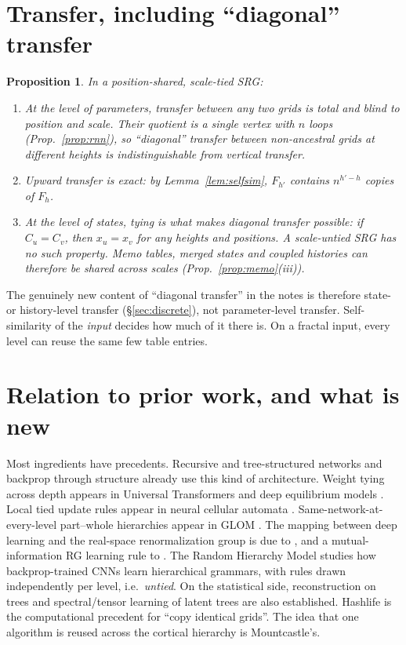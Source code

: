 \documentclass[11pt]{article}
\newtheorem{proposition}[theorem]{Proposition}
\theoremstyle{definition}
\begin{document}
\section{Transfer, including ``diagonal'' transfer}\label{sec:transfer}
\begin{proposition}\label{prop:transfer}
In a position-shared, scale-tied SRG:
\begin{enumerate}
\item At the level of parameters, transfer between any two grids is total and blind to position
and scale. Their quotient is a single vertex with $n$ loops (Prop.~\ref{prop:rnn}), so
``diagonal'' transfer between non-ancestral grids at different heights is indistinguishable
from vertical transfer.
\item Upward transfer is exact: by Lemma~\ref{lem:selfsim}, $F_{h'}$ contains $n^{h'-h}$
copies of $F_h$.
\item At the level of \emph{states}, tying is what makes diagonal transfer possible: if
$C_u=C_v$, then $x_u=x_v$ for \emph{any} heights and positions. A scale-untied SRG has no such
property. Memo tables, merged states and coupled histories can therefore be shared across
scales (Prop.~\ref{prop:memo}(iii)).
\end{enumerate}
\end{proposition}
\noindent The genuinely new content of ``diagonal transfer'' in the notes is therefore
state- or history-level transfer (\S\ref{sec:discrete}), not parameter-level transfer.
Self-similarity of the \emph{input} decides how much of it there is. On a fractal input, every
level can reuse the same few table entries.

\section{Relation to prior work, and what is new}\label{sec:related}
Most ingredients have precedents. Recursive and tree-structured networks and backprop through
structure \cite{goller1996,socher2011} already use this kind of architecture. Weight tying
across depth appears in Universal Transformers and deep equilibrium models
\cite{dehghani2019,bai2019}. Local tied update rules appear in neural cellular automata
\cite{mordvintsev2020}. Same-network-at-every-level part--whole hierarchies appear in GLOM
\cite{hinton2023}. The mapping between deep learning and the real-space renormalization group
is due to \cite{mehta2014}, and a mutual-information RG learning rule to \cite{koch2018}. The
Random Hierarchy Model \cite{cagnetta2024} studies how backprop-trained CNNs learn hierarchical
grammars, with rules drawn independently per level, i.e.\ \emph{untied}. On the statistical
side, reconstruction on trees \cite{kesten1966,evans2000,mossel2004} and spectral/tensor learning
of latent trees \cite{kruskal1977,allman2009,anandkumar2014} are also established. Hashlife
\cite{gosper1984} is the computational precedent for ``copy identical grids''. The idea that one
algorithm is reused across the cortical hierarchy is Mountcastle's.
\end{document}
